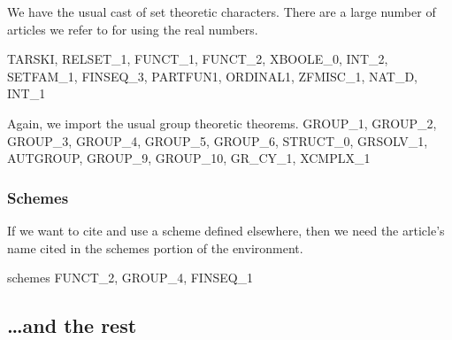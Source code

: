 We have the usual cast of set theoretic characters. There are a large
number of articles we refer to for using the real numbers.

\nwenddocs{}\endmoddef\nwstartdeflinemarkup{}\nwenddeflinemarkup
TARSKI, RELSET_1, FUNCT_1, FUNCT_2, XBOOLE_0, INT_2, SETFAM_1, FINSEQ_3,
PARTFUN1, ORDINAL1, ZFMISC_1, NAT_D, INT_1
\nwendcode{}\nwdocspar

Again, we import the usual group theoretic theorems.
\nwenddocs{}\endmoddef\nwstartdeflinemarkup{}\nwenddeflinemarkup
GROUP_1, GROUP_2, GROUP_3, GROUP_4, GROUP_5, GROUP_6, STRUCT_0, GRSOLV_1,
AUTGROUP, GROUP_9, GROUP_10, GR_CY_1, XCMPLX_1
\nwendcode{}\nwdocspar

\subsubsection{Schemes}
If we want to cite and use a scheme defined elsewhere, then we need the
article's name cited in the {\Tt{}schemes\nwendquote} portion of the environment.

\nwenddocs{}\endmoddef\nwstartdeflinemarkup{}\nwenddeflinemarkup
schemes FUNCT_2, GROUP_4, FINSEQ_1
\nwendcode{}\nwdocspar

\subsection{\dots and the rest}

